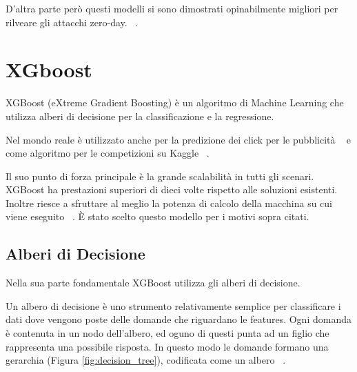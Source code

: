 D'altra parte però questi modelli si sono dimostrati opinabilmente migliori per rilveare gli attacchi zero-day. ~\cite{UnsupervisedAlgorithmsDetect2021}.


\section{XGboost}

XGBoost (eXtreme Gradient Boosting) è un algoritmo di Machine Learning che utilizza alberi di decisione per la classificazione e la regressione. 

Nel mondo reale è utilizzato anche per la predizione dei click per le pubblicità  ~\cite{hePracticalLessonsPredicting2014} e come algoritmo per le competizioni su Kaggle ~\cite{chenXGBoostScalableTree2016}.


Il suo punto di forza principale è la grande scalabilità in tutti gli scenari. XGBoost ha prestazioni superiori di dieci volte rispetto alle soluzioni esistenti.
Inoltre riesce a sfruttare al meglio la potenza di calcolo della macchina su cui viene eseguito ~\cite{chenXGBoostScalableTree2016}.
È stato scelto questo modello per i motivi sopra citati.

\subsection{Alberi di Decisione}

Nella sua parte fondamentale XGBoost utilizza gli alberi di decisione.

Un albero di decisione è uno strumento relativamente semplice per classificare i dati dove vengono poste delle domande che riguardano le features. Ogni domanda è contenuta in un nodo dell'albero, ed oguno di questi punta ad un figlio che rappresenta una possibile risposta.
In questo modo le domande formano una gerarchia (Figura \ref{fig:decision_tree}), codificata come un albero ~\cite{kingsfordWhatAreDecision2008}.


